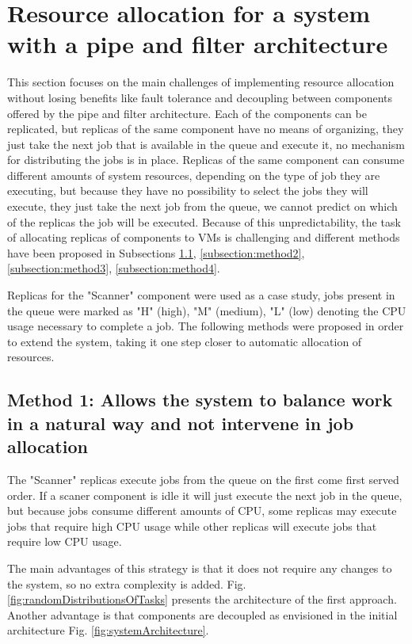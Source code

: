 \section{Resource allocation for a system with a pipe and filter architecture}
\label{sec:resourceAllocation}
This section focuses on the main challenges of implementing resource allocation without losing benefits like fault tolerance and decoupling between components offered by the pipe and filter architecture. Each of the components can be replicated, but replicas of the same component have no means of organizing, they just take the next job that is available in the queue and execute it, no mechanism for distributing the jobs is in place. Replicas of the same component can consume different amounts of system resources, depending on the type of job they are executing, but because they have no possibility to select the jobs they will execute, they just take the next job from the queue, we cannot predict on which of the replicas the job will be executed. Because of this unpredictability, the task of allocating replicas of components to VMs is challenging and different methods have been proposed in Subsections \ref{subsection:method1}, \ref{subsection:method2}, \ref{subsection:method3}, \ref{subsection:method4}.

Replicas for the "Scanner" component were used as a case study, jobs present in the queue were marked as "H" (high), "M" (medium), "L" (low) denoting the CPU usage necessary to complete a job. The following methods were proposed in order to extend the system, taking it one step closer to automatic allocation of resources.

\subsection{Method 1: Allows the system to balance work in a natural way and not intervene in job allocation}
\label{subsection:method1}
The "Scanner" replicas execute jobs from the queue on the first come first served order. If a scaner component is idle it will just execute the next job in the queue, but because jobs consume different amounts of CPU, some replicas may execute jobs that require high CPU usage while other replicas will execute jobs that require low CPU usage.

The main advantages of this strategy is that it does not require any changes to the system, so no extra complexity is added. Fig. \ref{fig:randomDistributionsOfTasks} presents the architecture of the first approach. Another advantage is that components are decoupled as envisioned in the initial architecture Fig. \ref{fig:systemArchitecture}.

